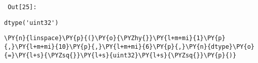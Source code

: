         {\par%
        \vspace{-1\smallerfontscale}%
        \noindent%
        \begin{minipage}{\cellleftmargin}%
    \hfill%
    {\smaller%
    \tt%
    \color{nbframe-out-prompt}%
    Out[25]:}%
    \hspace{\inputpadding}%
    \hspace{0em}%
    \hspace{3pt}%
    \end{minipage}%
        }%
    \begin{addmargin}[\cellleftmargin]{0em}%
    {\smaller%
    \vspace{-1\smallerfontscale}%
    
    
    
    \begin{verbatim}
dtype('uint32')
    \end{verbatim}

    
}%
    \end{addmargin}%

{\par%
\vspace{-1\baselineskip}%
}%
\begin{notebookcell}[26]%
\begin{addmargin}[\cellleftmargin]{0em}%
{\smaller%
\par%
%
\vspace{-1\smallerfontscale}%
\begin{Verbatim}[commandchars=\\\{\}]
\PY{n}{linspace}\PY{p}{(}\PY{o}{\PYZhy{}}\PY{l+m+mi}{1}\PY{p}{,}\PY{l+m+mi}{10}\PY{p}{,}\PY{l+m+mi}{6}\PY{p}{,}\PY{n}{dtype}\PY{o}{=}\PY{l+s}{\PYZsq{}}\PY{l+s}{uint32}\PY{l+s}{\PYZsq{}}\PY{p}{)}
\end{Verbatim}
%
\par%
\vspace{-1\smallerfontscale}}%
\end{addmargin}
\end{notebookcell}

\par\vspace{1\smallerfontscale}%
    

